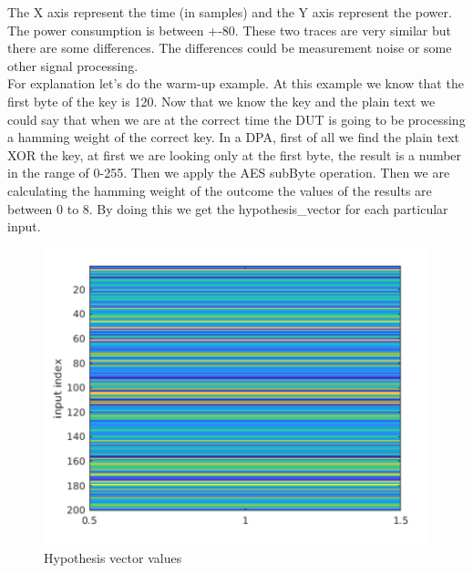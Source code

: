 The X axis represent the time (in samples) and the Y axis represent the power. The power consumption is between +-80. These two traces are very similar but there are some differences. The differences could be measurement noise or some other signal processing.\\
For explanation let’s do the warm-up example. At this example we know that the first byte of the key is 120. Now that we know the key and the plain text we could say that when we are at the correct time the DUT is going to be processing a hamming weight of the correct key. In a DPA, first of all we find the plain text XOR the key, at first we are looking only at the first byte, the result is a number in the range of 0-255. Then we apply the AES subByte operation. Then we are calculating the hamming weight of the outcome the values of the results are between 0 to 8. By doing this we get the hypothesis\_vector for each particular input.

\begin{figure}[H]
    \centering
    \includegraphics[width=1.0\textwidth]{images/chapter8/hypothesis_vector_values.png}
    \caption{Hypothesis vector values} \label{c8_Matlab_hypothesis_vector_values:fig}
\end{figure}


